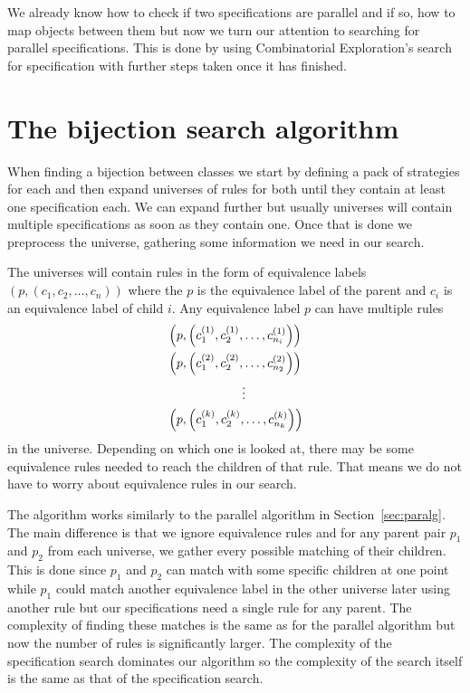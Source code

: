 \label{ch:search}
We already know how to check if two specifications are parallel and if so, how to map objects between them but now we turn our attention to searching for parallel specifications. This is done by using Combinatorial Exploration's search for specification with further steps taken once it has finished.

\section{The bijection search algorithm}
When finding a bijection between classes we start by defining a pack of strategies for each and then expand universes of rules for both until they contain at least one specification each. We can expand further but usually universes will contain multiple specifications as soon as they contain one. Once that is done we preprocess the universe, gathering some information we need in our search.

The universes will contain rules in the form of equivalence labels $(p, (c_1,c_2,\dotsc,c_n))$ where the $p$ is the equivalence label of the parent and $c_i$ is an equivalence label of child $i$. Any equivalence label $p$ can have multiple rules
\begin{align*}
    &\left(p, \left(c^{(1)}_1, c^{(1)}_2, \dotsc, c^{(1)}_{n_i}\right)\right)\\
    &\left(p, \left(c^{(2)}_1, c^{(2)}_2, \dotsc, c^{(2)}_{n_2}\right)\right)\\
    &\hspace{2.1cm}\vdots\\
    &\left(p, \left(c^{(k)}_1, c^{(k)}_2, \dotsc, c^{(k)}_{n_k}\right)\right)
\end{align*}
in the universe. Depending on which one is looked at, there may be some equivalence rules needed to reach the children of that rule. That means we do not have to worry about equivalence rules in our search.

The algorithm works similarly to the parallel algorithm in Section~\ref{sec:paralg}. The main difference is that we ignore equivalence rules and for any parent pair $p_1$ and $p_2$ from each universe, we gather every possible matching of their children. This is done since $p_1$ and $p_2$ can match with some specific children at one point while $p_1$ could match another equivalence label in the other universe later using another rule but our specifications need a single rule for any parent. The complexity of finding these matches is the same as for the parallel algorithm but now the number of rules is significantly larger. The complexity of the specification search dominates our algorithm so the complexity of the search itself is the same as that of the specification search.

